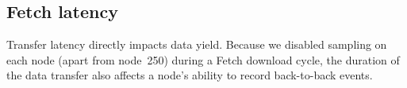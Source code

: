 



\subsection{Fetch latency}

Transfer latency directly impacts data yield. Because we disabled sampling on
each node (apart from node~250) during a Fetch download cycle, the duration
of the data transfer also affects a node's ability to record back-to-back
events.  

